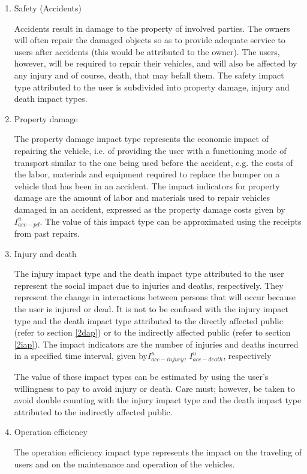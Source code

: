 \begin{enumerate}
 \item Safety (Accidents)
 
 Accidents result in damage to the property of involved parties. The owners will often repair the damaged objects so as to provide adequate service to users after accidents (this would be attributed to the owner). The users, however, will be required to repair their vehicles, and will also be affected by any injury and of course, death, that may befall them. The safety impact type attributed to the user is subdivided into property damage, injury and death impact types.
 \item Property damage
 
  The property damage impact type represents the economic impact of repairing the vehicle, i.e. of providing the user with a functioning mode of transport similar to the one being used before the accident, e.g. the costs of the labor, materials and equipment required to replace the bumper on a vehicle that has been in an accident. The impact indicators for property damage are the amount of labor and materials used to repair vehicles damaged in an accident, expressed as the property damage costs given by $I_{acc - pd}^u$. The value of this impact type can be approximated using the receipts from past repairs.
\item Injury and death

The injury impact type and the death impact type attributed to the user represent the social impact due to injuries and deaths, respectively. They represent the change in interactions between persons that will occur because the user is injured or dead. It is not to be confused with the injury impact type and the death impact type attributed to the directly affected public (refer to section \ref{2dap}) or to the indirectly affected public (refer to section \ref{2iap}). The impact indicators are the number of injuries and deaths incurred in a specified time interval, given by$I_{acc - injury}^u$, $I_{acc - death}^u$, respectively

The value of these impact types can be estimated by using the user's willingness to pay to avoid injury or death. Care must; however, be taken to avoid double counting with the injury impact type and the death impact type attributed to the indirectly affected public. 

\item Operation efficiency

The operation efficiency impact type represents the impact on the traveling of users and on the maintenance and operation of the vehicles. 


\end{enumerate}
